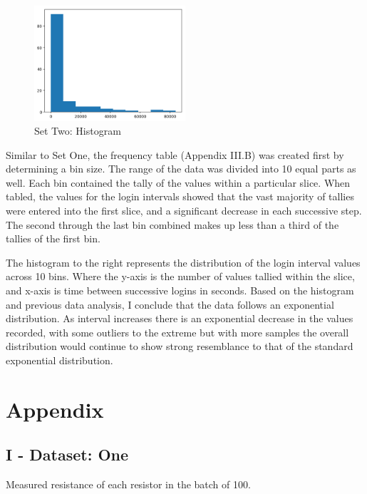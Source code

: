 \documentclass[10pt]{report}
\begin{document}
\begin{figure}
    \centering
    \includegraphics[width=0.50\textwidth]{results/logininterval_histogram}
    \caption{Set Two: Histogram}
\end{figure}

Similar to Set One, the frequency table (Appendix III.B) was created first by determining a bin size. The range of the data was
divided into 10 equal parts as well. Each bin contained the tally of the values within a particular slice.
When tabled, the values for the login intervals showed that the vast majority
of tallies were entered into the first slice, and a significant decrease in each successive step. The second
through the last bin combined makes up less than a third of the tallies of the first bin.


The histogram to the right represents the distribution of the login interval values across 10 bins.
Where the y-axis is the number of values tallied within the slice, and x-axis is time between successive logins
in seconds.
Based on the histogram and previous data analysis, I conclude that the data follows an exponential distribution. As
interval increases there is an exponential decrease in the values recorded, with some outliers to the extreme but 
with more samples the overall distribution would continue to show strong resemblance to that of the standard
exponential distribution.


\newpage
\section*{Appendix}

\subsection*{I - Dataset: One}

Measured resistance of each resistor in the batch of 100.
\end{document}
